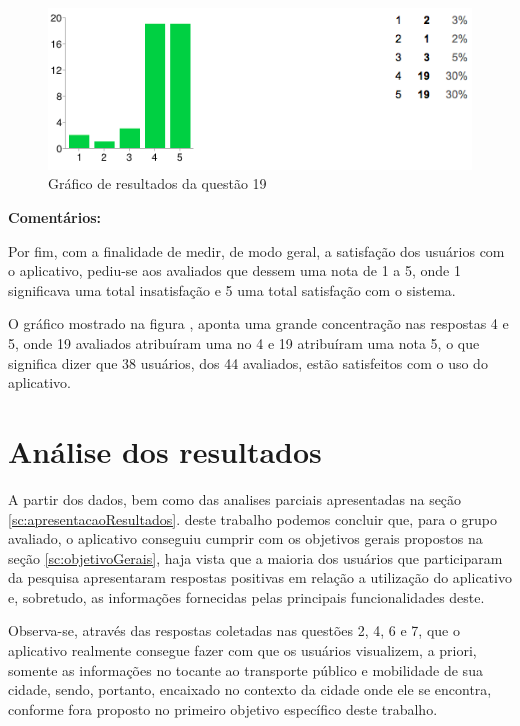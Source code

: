\begin{figure}[h]
\begin{center}
  \includegraphics[width=16cm]{images/graficos/questao19.png}
  \caption{Gráfico de resultados da questão 19}
  \label{fig:questao19}
\end{center}
\end{figure}

\textbf{Comentários:}

Por fim, com a finalidade de medir, de modo geral, a satisfação dos usuários com o aplicativo, pediu-se aos avaliados que dessem uma nota de 1 a 5, onde 1 significava uma total insatisfação e 5 uma total satisfação com o sistema. 
	
O gráfico mostrado na figura , aponta uma grande concentração nas respostas 4 e 5, onde 19 avaliados atribuíram uma no 4 e 19 atribuíram uma nota 5, o que significa dizer que 38 usuários, dos 44 avaliados, estão satisfeitos com o uso do aplicativo.\newline

\section{Análise dos resultados}
\label{sc:analiseResultados}

A partir dos dados, bem como das analises parciais apresentadas na seção \ref{sc:apresentacaoResultados}. deste trabalho podemos concluir que, para o grupo avaliado, o aplicativo conseguiu cumprir com os objetivos gerais propostos na seção \ref{sc:objetivoGerais}, haja vista que a maioria dos usuários que participaram da pesquisa apresentaram respostas positivas em relação a utilização do aplicativo e, sobretudo, as informações fornecidas pelas principais funcionalidades deste.
	
Observa-se, através das respostas coletadas nas questões  2, 4, 6 e 7, que o aplicativo realmente consegue fazer com que os usuários visualizem, a priori, somente as informações no tocante ao transporte público e mobilidade de sua cidade, sendo, portanto, encaixado no contexto da cidade onde ele se encontra, conforme fora proposto no primeiro objetivo específico deste trabalho. 
	
